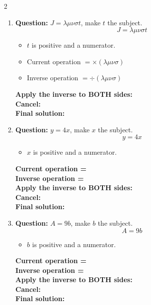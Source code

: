 \documentclass[11pt]{article}
\begin{document}
\begin{multicols}{2}
\begin{enumerate}[leftmargin=*, itemsep=10pt]
\item \textbf{Question:} \( J = \lambda \mu \nu \sigma t \), make \( t \) the subject.
\[
J=\lambda\mu\nu\sigma t
\]
\begin{itemize}[leftmargin=*, itemsep=2pt]
\item \(t\) is positive and a numerator.
\item Current operation \(= \times (\lambda\mu\nu\sigma)\)
\item Inverse operation \(= \div (\lambda\mu\nu\sigma)\)
\end{itemize}
\textbf{Apply the inverse to BOTH sides:} \\[1.5cm]
\textbf{Cancel:} \\[1.5cm]
\textbf{Final solution:}\\[1.5cm]

\columnbreak
\item \textbf{Question:} \( y = 4x \), make \( x \) the subject.
\[
y=4x
\]
\begin{itemize}[leftmargin=*, itemsep=2pt]
\item \(x\) is positive and a numerator.
\end{itemize}
\textbf{Current operation =} \\[1cm]
\textbf{Inverse operation =} \\[1cm]
\textbf{Apply the inverse to BOTH sides:} \\[1.5cm]
\textbf{Cancel:} \\[1.5cm]
\textbf{Final solution:}\\[1.5cm]

\item \textbf{Question:} \( A = 9b \), make \( b \) the subject.
\[
A=9b
\]
\begin{itemize}[leftmargin=*, itemsep=2pt]
\item \(b\) is positive and a numerator.
\end{itemize}
\textbf{Current operation =} \\[1cm]
\textbf{Inverse operation =} \\[1cm]
\textbf{Apply the inverse to BOTH sides:} \\[1.5cm]
\textbf{Cancel:} \\[1.5cm]
\textbf{Final solution:}\\[1.5cm]


\end{enumerate}
\end{multicols}
\end{document}
